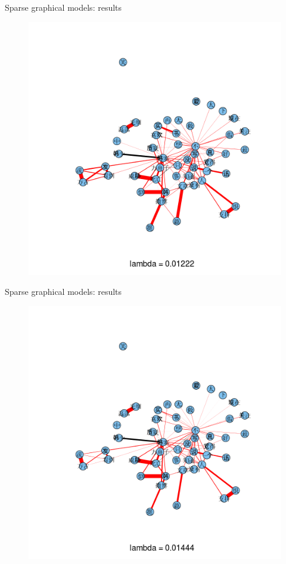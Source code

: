 \documentclass[12pt, trans]{beamer}
\newcommand{\1}[1]{{\mathbf 1}\left\{#1\right\}}        %
\begin{document}
\begin{frame}{Sparse graphical models: results}

\begin{figure}
  \centering
  \includegraphics[height=0.9\textheight]{./../../gLassoResults/glasso2.png} 
\end{figure}

\end{frame}
\begin{frame}{Sparse graphical models: results}

\begin{figure}
  \centering
  \includegraphics[height=0.9\textheight]{./../../gLassoResults/glasso3.png} 
\end{figure}

\end{frame}
\end{document}
